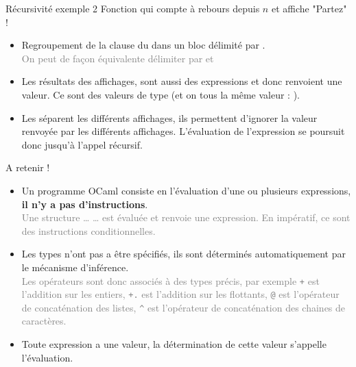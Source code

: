 \documentclass[10pt]{beamer}
\begin{document}
\begin{frame}{\Ctitle}{\stitle}
	\begin{exampleblock}{Récursivité exemple 2}
		Fonction qui compte à rebours depuis $n$ et affiche "Partez" !
		\begin{itemize}
			\item<2-> Regroupement de la clause du  dans un bloc délimité par \kw{(} \kw{)}. \\
				\textcolor{gray}{On peut de façon équivalente délimiter par  et }
			\item<3-> Les résultats des affichages, sont aussi des expressions et donc renvoient une valeur. Ce sont des valeurs  de type  (et on tous la même valeur : \kw{()}).
			\item<4-> Les \kw{;} séparent les différents affichages, ils permettent d'ignorer la valeur renvoyée par les différents affichages. L'évaluation de l'expression se poursuit donc jusqu'à l'appel récursif.
		\end{itemize}
	\end{exampleblock}
\end{frame}

\begin{frame}{\Ctitle}{\stitle}
	\begin{block}{\textcolor{yellow}{\danger} A retenir !}
		\begin{itemize}
			\item<1-> Un programme OCaml consiste en l'évaluation d'une ou plusieurs expressions, \textbf{il n'y a pas d'instructions}.\\
				\onslide<2->\textcolor{gray}{Une structure  \dots {} \dots {} est évaluée et renvoie une expression. En impératif, ce sont des instructions conditionnelles.}
			\item<3-> Les types n'ont pas a être spécifiés, ils sont déterminés automatiquement par le mécanisme d'inférence.\\
			\onslide<3->\textcolor{gray}{Les opérateurs sont donc associés à des types précis, par exemple {\tt +} est l'addition sur les entiers, {\tt +.} est l'addition sur les flottants, \texttt{@} est l'opérateur de concaténation des listes, \texttt{^} est l'opérateur de concaténation des chaines de caractères.}
			\item<4-> Toute expression a une valeur, la détermination de cette valeur s'appelle l'évaluation.
		\end{itemize}
	\end{block}
\end{frame}
\end{document}
